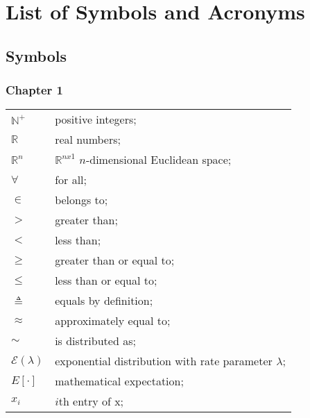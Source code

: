 \chapter*{List of Symbols and Acronyms}
\section*{Symbols}

\setlength{\LTleft}{10pt}

\footnotesize
\subsection*{Chapter 1}
\begin{longtable}{ll}
	$\mathbb{N}^+$			& positive integers; \\
	$\mathbb{R}$			& real numbers; \\
	$\mathbb{R}^n$			& $\mathbb{R}^{nx1}$ $n$-dimensional Euclidean space; \\
	
	$\forall$				& for all; \\
	$\in$					& belongs to; \\
	$>$						& greater than; \\
	$<$						& less than; \\
	$\geq$					& greater than or equal to; \\
	$\leq$					& less than or equal to; \\
	$\triangleq$			& equals by definition; \\	
	$\approx$				& approximately equal to; \\
	$\sim$					& is distributed as; \\
	

	$\mathcal{E}(\lambda)$	& exponential distribution with rate parameter $\lambda$; \\
	$E[\mathord{\cdot}]$	& mathematical expectation; \\
	$x_i$					& $i$th entry of x; \\	
	

\end{longtable}
